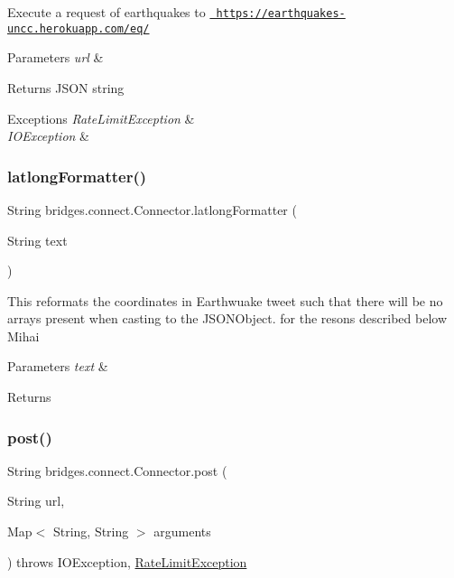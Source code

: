 Execute a request of earthquakes to \href{https://earthquakes-uncc.herokuapp.com/eq/}{\texttt{ https\+://earthquakes-\/uncc.\+herokuapp.\+com/eq/}} 
\begin{DoxyParams}{Parameters}
{\em url} & \\
\hline
\end{DoxyParams}
\begin{DoxyReturn}{Returns}
J\+S\+ON string 
\end{DoxyReturn}

\begin{DoxyExceptions}{Exceptions}
{\em Rate\+Limit\+Exception} & \\
\hline
{\em I\+O\+Exception} & \\
\hline
\end{DoxyExceptions}
\mbox{\label{classbridges_1_1connect_1_1_connector_a2318cd93d18ef58285598f6f9cdf727b}} 
\subsubsection{\texorpdfstring{latlongFormatter()}{latlongFormatter()}}
{\footnotesize\ttfamily String bridges.\+connect.\+Connector.\+latlong\+Formatter (\begin{DoxyParamCaption}\item[{String}]{text }\end{DoxyParamCaption})}

This reformats the coordinates in Earthwuake tweet such that there will be no arrays present when casting to the J\+S\+O\+N\+Object. for the resons described below Mihai 
\begin{DoxyParams}{Parameters}
{\em text} & \\
\hline
\end{DoxyParams}
\begin{DoxyReturn}{Returns}

\end{DoxyReturn}
\mbox{\label{classbridges_1_1connect_1_1_connector_a88e465aed707d59b96958dcc946ff6b4}} 
\subsubsection{\texorpdfstring{post()}{post()}\hspace{0.1cm}{\footnotesize\ttfamily [1/2]}}
{\footnotesize\ttfamily String bridges.\+connect.\+Connector.\+post (\begin{DoxyParamCaption}\item[{String}]{url,  }\item[{Map$<$ String, String $>$}]{arguments }\end{DoxyParamCaption}) throws I\+O\+Exception, \mbox{\hyperlink{classbridges_1_1validation_1_1_rate_limit_exception}{Rate\+Limit\+Exception}}}

